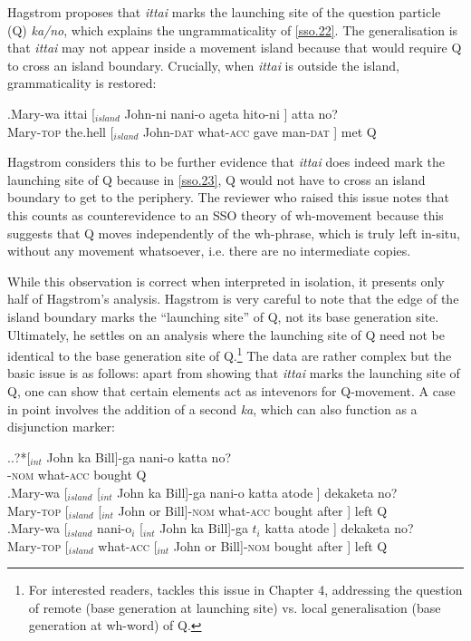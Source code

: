\documentclass[charis]{glossa}
\begin{document}
Hagstrom proposes that \textit{ittai} marks the launching site of the question particle (Q) \textit{ka/no}, which explains the ungrammaticality of \ref{sso.22}. The generalisation is that \textit{ittai} may not appear inside a movement island because that would require Q to cross an island boundary. Crucially, when \textit{ittai} is outside the island, grammaticality is restored:

\exg.\label{sso.23}Mary-wa ittai [$_{island}$ John-ni nani-o ageta hito-ni ] atta no?\\
   Mary-\textsc{top} the.hell [$_{island}$ John-\textsc{dat} what-\textsc{acc} gave man-\textsc{dat} ] met Q\\

Hagstrom considers this to be further evidence that \textit{ittai} does indeed mark the launching site of Q because in \ref{sso.23}, Q would not have to cross an island boundary to get to the periphery. The reviewer who raised this issue notes that this counts as counterevidence to an SSO theory of wh-movement because this suggests that Q moves independently of the wh-phrase, which is truly left in-situ, without any movement whatsoever, i.e. there are no intermediate copies.

While this observation is correct when interpreted in isolation, it presents only half of Hagstrom's analysis. Hagstrom is very careful to note that the edge of the island boundary marks the ``launching site'' of Q, not its base generation site. Ultimately, he settles on an analysis where the launching site of Q need not be identical to the base generation site of Q.\footnote{For interested readers, \cite{hagstrom:1998} tackles this issue in Chapter 4, addressing the question of remote (base generation at launching site) vs. local generalisation (base generation at wh-word) of Q.} The data are rather complex but the basic issue is as follows: apart from showing that \textit{ittai} marks the launching site of Q, one can show that certain elements act as intevenors for Q-movement. A case in point involves the addition of a second \textit{ka}, which can also function as a disjunction marker:

\ex.\ag.?*\label{sso.24a}[$_{int}$ John ka Bill]-ga nani-o katta no?\\
      [$_{int}$ John or Bill]-\textsc{nom} what-\textsc{acc} bought Q\\
   \bg.\label{sso.24b}Mary-wa [$_{island}$ [$_{int}$ John ka Bill]-ga nani-o katta atode ] dekaketa no?\\
      Mary-\textsc{top} [$_{island}$ [$_{int}$ John or Bill]-\textsc{nom} what-\textsc{acc} bought after ] left Q\\
   \bg.\label{sso.24c}Mary-wa [$_{island}$ nani-o$_i$ [$_{int}$ John ka Bill]-ga $t_i$ katta atode ] dekaketa no?\\
      Mary-\textsc{top} [$_{island}$ what-\textsc{acc} [$_{int}$ John or Bill]-\textsc{nom} {} bought after ] left Q\\
\end{document}
